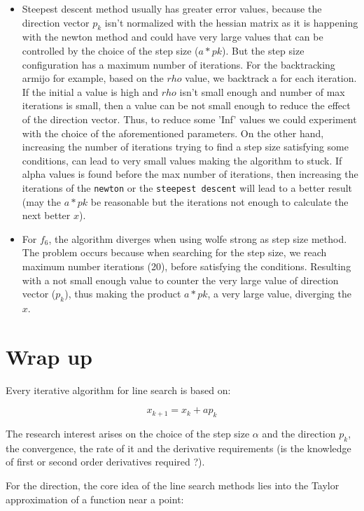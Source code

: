 \documentclass[a4paper,11pt]{article}
\numberwithin{equation}{section} %
\begin{document}
\begin{itemize}
    \item Steepest descent method usually has greater error values, because the direction vector $p_k$ isn't normalized with the hessian matrix as it is happening with the newton method and could have very large values that can be controlled by the choice of the step size ($a*pk$). But the step size configuration has a maximum number of iterations. For the backtracking armijo for example, based on the $rho$ value, we backtrack a for each iteration. If the initial a value is high and $rho$ isn't small enough and number of max iterations is small, then a value can be not small enough to reduce the effect of the direction vector. Thus, to reduce some 'Inf' values we could experiment with the choice of the aforementioned parameters. On the other hand, increasing the number of iterations trying to find a step size satisfying some conditions, can lead to very small values making the algorithm to stuck. If alpha values is found before the max number of iterations, then increasing the iterations of the \verb|newton| or the \verb|steepest descent| will lead to a better result (may the $a*pk$ be reasonable but the iterations not enough to calculate the next better $x$).

    \item For $f_6$, the algorithm diverges when using wolfe strong as step size method. The problem occurs because when searching for the step size, we reach maximum number iterations (20), before satisfying the conditions. Resulting with a not small enough value to counter the very large value of direction vector ($p_k$), thus making the product $a*pk$, a very large value, diverging the $x$.
    
\end{itemize} 


\section{Wrap up}

Every iterative algorithm for line search is based on:

\[x_{k+1} = x_k + a p_k\]

The research interest arises on the choice of the step size $\alpha$ and the direction $p_k$, the convergence, the rate of it and the derivative requirements (is the knowledge of first or second order derivatives required ?).

For the direction,  
the core idea of the line search methods lies into the Taylor approximation of a function near a point:
\end{document}
